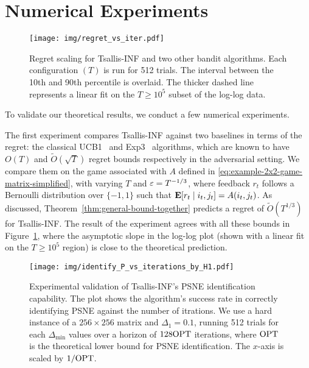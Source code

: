 \section{Numerical Experiments}\label{sec:experiments}



\begin{figure}[t]
    \centering
    \texttt{[image: img/regret\_vs\_iter.pdf]}
    \caption{
    Regret scaling for Tsallis-INF and two other bandit algorithms. Each configuration $(T)$ is run for 512 trials. The interval between the 10th and 90th percentile is overlaid. The thicker dashed line represents a linear fit on the $T\geq 10^5$ subset of the log-log data.}
    \label{fig:regret-comparison}
\end{figure}


To validate our theoretical results,
we conduct a few numerical experiments.

The first experiment compares
Tsallis-INF against two baselines in terms of the regret: 
the classical UCB1~\citep{auer2002finite} and Exp3~\citep{auer2002nonstochastic} algorithms, 
which are known to have $O(T)$ and $\tilde{O}(\sqrt{T})$ regret bounds respectively in the adversarial setting.
We compare them on the game associated with $A$ defined in \eqref{eq:example-2x2-game-matrix-simplified},
with varying $T$ and $\varepsilon=T^{-1/3}$,
where feedback $r_t$ follows a Bernoulli distribution over $\{ -1, 1 \}$ such that $ \operatorname*{\mathbf{E}}[r_t \mid i_t, j_t] = A(i_t, j_t)$.
As discussed, Theorem~\ref{thm:general-bound-together} predicts a regret of $\tilde{O}(T^{1/3})$ for Tsallis-INF.
The result of the experiment agrees with all these bounds in Figure~\ref{fig:regret-comparison},
where the asymptotic slope in the log-log plot (shown with a linear fit on the $T\geq 10^5$ region) is close to the theoretical prediction.


\begin{figure}[t]
    \centering
    \texttt{[image: img/identify\_P\_vs\_iterations\_by\_H1.pdf]}
    \caption{
        Experimental validation of Tsallis-INF's PSNE identification capability.
        The plot shows the algorithm's success rate in correctly identifying PSNE
        against the number of itrations.
        We use a hard instance of a $256\times 256$ matrix and $\Delta_1=0.1$,
        running 512 trials for each $\Delta_{\min}$ values
        over a horizon of $128\mathrm{OPT}$ iterations,
        where $\mathrm{OPT}$ is the theoretical lower bound for PSNE identification.
        The $x$-axis is scaled by $1/\mathrm{OPT}$.
        }
    \label{fig:PSNE-id-rate}
\end{figure}

